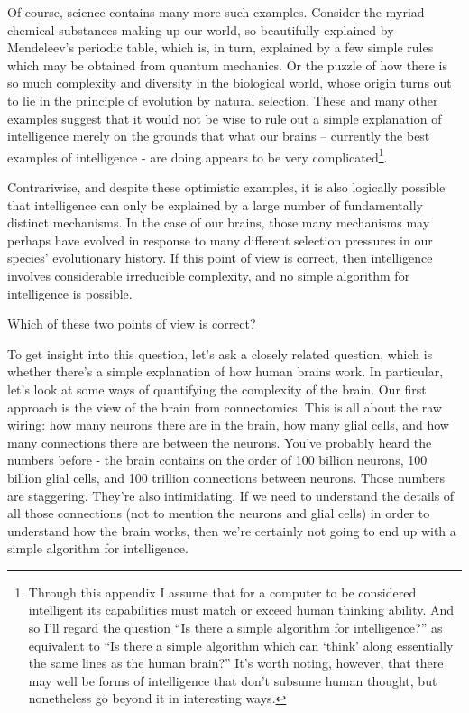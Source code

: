 \documentclass[a4paper,twoside,10pt]{book}
\begin{document}
Of course, science contains many more such examples. Consider the myriad chemical substances making up our world, so beautifully explained by Mendeleev's periodic table, which is, in turn, explained by a few simple rules which may be obtained from quantum mechanics. Or the puzzle of how there is so much complexity and diversity in the biological world, whose origin turns out to lie in the principle of evolution by natural selection. These and many other examples suggest that it would not be wise to rule out a simple explanation of intelligence merely on the grounds that what our brains -- currently the best examples of intelligence - are doing appears to be very complicated\footnote{Through this appendix I assume that for a computer to be considered intelligent its capabilities must match or exceed human thinking ability. And so I'll regard the question ``Is there a simple algorithm for intelligence?'' as equivalent to ``Is there a simple algorithm which can `think' along essentially the same lines as the human brain?'' It's worth noting, however, that there may well be forms of intelligence that don't subsume human thought, but nonetheless go beyond it in interesting ways.}.

Contrariwise, and despite these optimistic examples, it is also logically possible that intelligence can only be explained by a large number of fundamentally distinct mechanisms. In the case of our brains, those many mechanisms may perhaps have evolved in response to many different selection pressures in our species' evolutionary history. If this point of view is correct, then intelligence involves considerable irreducible complexity, and no simple algorithm for intelligence is possible.

Which of these two points of view is correct?

To get insight into this question, let's ask a closely related question, which is whether there's a simple explanation of how human brains work. In particular, let's look at some ways of quantifying the complexity of the brain. Our first approach is the view of the brain from connectomics. This is all about the raw wiring: how many neurons there are in the brain, how many glial cells, and how many connections there are between the neurons. You've probably heard the numbers before - the brain contains on the order of 100 billion neurons, 100 billion glial cells, and 100 trillion connections between neurons. Those numbers are staggering. They're also intimidating. If we need to understand the details of all those connections (not to mention the neurons and glial cells) in order to understand how the brain works, then we're certainly not going to end up with a simple algorithm for intelligence.
\end{document}
